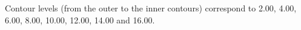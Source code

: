 Contour levels (from the outer to the inner contours) correspond to 2.00, 4.00, 6.00, 8.00, 10.00, 12.00, 14.00 and 16.00.
